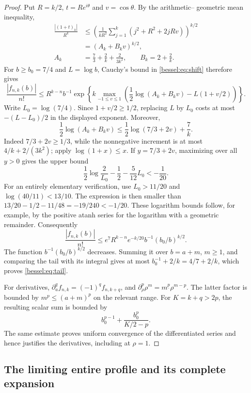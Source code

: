 \begin{proof}
Put $R=k/2$, $t=Re^{i\theta}$ and $v=\cos\theta$. By the arithmetic--
geometric mean inequality,
\begin{align*}
 \frac{|(1+t)_k|}{R^k}
 &\leq\left(\frac{1}{kR^2}
       \sum_{j=1}^k(j^2+R^2+2jRv)\right)^{k/2}\\
 &=(A_k+B_kv)^{k/2},\\
 A_k&=\frac73+\frac2k+\frac{2}{3k^2},\qquad
 B_k=2+\frac2k.
\end{align*}
For $b\geq b_0=7/4$ and $L=\log b$, Cauchy's bound in
\eqref{bessel:eq:shift} therefore gives
\begin{equation}\label{bessel:eq:pointtail}
 \frac{|f_{n,k}(b)|}{n!}
 \leq R^{k-n}b^{-1}
 \exp\left\{k\max_{-1\leq v\leq1}
 \left(\frac12\log(A_k+B_kv)-L(1+v/2)\right)\right\}.
\end{equation}
Write $L_0=\log(7/4)$. Since $1+v/2\geq1/2$, replacing $L$ by
$L_0$ costs at most $-(L-L_0)/2$ in the displayed exponent. Moreover,
\[
 \frac12\log(A_k+B_kv)
 \leq\frac12\log(7/3+2v)+\frac7k.
\]
Indeed $7/3+2v\geq1/3$, while the nonnegative increment is at most
$4/k+2/(3k^2)$; apply $\log(1+x)\leq x$.
If $y=7/3+2v$, maximizing over all $y>0$ gives the upper bound
\[
 \frac12\log\frac2{L_0}-\frac12-\frac5{12}L_0< -\frac1{20}.
\]
For an entirely elementary verification, use $L_0>11/20$ and
$\log(40/11)<13/10$. The expression is then smaller than
$13/20-1/2-11/48=-19/240<-1/20$. These logarithm bounds follow,
for example, by the positive atanh series for the logarithm with a
geometric remainder.
Consequently
\[
 \frac{|f_{n,k}(b)|}{n!}
 \leq e^7R^{k-n}e^{-k/20}b^{-1}
       (b_0/b)^{k/2}.
\]
The function $b^{-1}(b_0/b)^{k/2}$ decreases. Summing it over
$b=a+m$, $m\geq1$, and comparing the tail with its integral gives
at most $b_0^{-1}+2/k=4/7+2/k$, which proves
\eqref{bessel:eq:tail}.

For derivatives, $\partial_a^qf_{n,k}=(-1)^qf_{n,k+q}$, and
$\partial_\rho^p\rho^m=m^{\underline p}\rho^{m-p}$. The latter
factor is bounded by $m^p\leq(a+m)^p$ on the relevant range. For
$K=k+q>2p$, the resulting scalar sum is bounded by
\[
 b_0^{p-1}+\frac{b_0^p}{K/2-p}.
\]
The same estimate proves uniform convergence of the differentiated
series and hence justifies the derivatives, including at $\rho=1$.
\end{proof}

\subsection{The limiting entire profile and its complete expansion}

